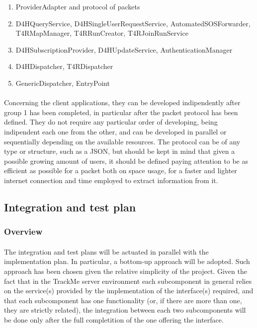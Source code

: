 \begin{enumerate}
\item ProviderAdapter and protocol of packets
\item D4HQueryService, D4HSingleUserRequestService, AutomatedSOSForwarder, T4RMapManager, T4RRunCreator, T4RJoinRunService
\item D4HSubscriptionProvider, D4HUpdateService, AuthenticationManager
\item D4HDispatcher, T4RDispatcher
\item GenericDispatcher, EntryPoint
\end{enumerate}

\paragraph{} Concerning the client applications, they can be developed indipendently after group 1 has been completed, in particular after the packet protocol has been defined. They do not require any particular order of developing, being indipendent each one from the other, and can be developed in parallel or sequentially depending on the available resources. 
\newline The protocol can be of any type or structure, such as a JSON, but should be kept in mind that given a possible growing amount of users, it should be defined paying attention to be as efficient as possible for a packet both on space usage, for a faster and lighter internet connection and time employed to extract information from it.


{\color{secblue}\subsection{Integration and test plan}}

{\color{secblue}\subsubsection{Overview}}
\paragraph{} The integration and test plans will be actuated in parallel with the implementation plan. In particular, a bottom-up approach will be adopted. Such approach has been chosen given the relative simplicity of the project.
Given the fact that in the TrackMe server environment each subcomponent in general relies on the service(s) provided by the implementation of the interface(s) required, and that each subcomponent has one functionality (or, if there are more than one, they are strictly related), the integration between each two subcomponents will be done only after the full completition of the one offering the interface.
